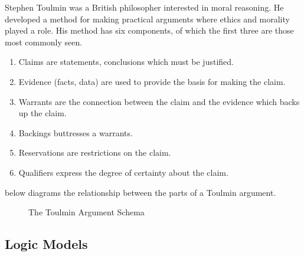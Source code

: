 Stephen Toulmin was a British philosopher interested in moral reasoning. He developed a method for making practical arguments where ethics and morality played a role. His method has six components, of which the first three are those most commonly seen.
\begin{enumerate}[topsep=0.3\baselineskip,itemsep=0.25\baselineskip]
  \item Claims are statements, conclusions which must be justified.
  \item Evidence (facts, data) are used to provide the basis for making the claim.
  \item Warrants are the connection between the claim and the evidence which backs up the claim.
  \item Backings buttresses a warrants.
  \item Reservations are restrictions on the claim.
  \item Qualifiers express the degree of certainty about the claim.
\end{enumerate}

 below diagrams the relationship between the parts of a Toulmin argument.

\begin{figure}[ht]
  \caption{The Toulmin Argument Schema}%
  \label{fig:toulmin-arg}%
\end{figure}

\subsection{Logic Models}%
\label{sec:logic-models}\indent%

